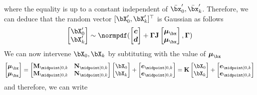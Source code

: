 where the equality is up to a constant independent of $\centeredxzero, \centeredxk$.
Therefore, we can deduce that the random vector $[\bX_0', \bX_k']^\top$ is Gaussian as follows
\begin{equation*}
    \begin{aligned}
       \begin{bmatrix}\bX_0'\\\bX_k'\end{bmatrix}
       \sim
       \normpdf(
            \begin{bmatrix}\biaszero\\\biask\end{bmatrix}
            + \mathbf{\Gamma} \mathbf{J} \begin{bmatrix}\meantau \\ \meantau\end{bmatrix}
            ,
            \mathbf{\Gamma}
       )
    \end{aligned}
\end{equation*}
We can now intervene $\bX_0, \bX_k$ by subtituting with the value of $\meantau$
\begin{align*}
    \begin{bmatrix}\meantau \\ \meantau\end{bmatrix}
        = \begin{bmatrix}
            \pizero_{\midpoint| 0, k} & \pik_{\midpoint| 0, k}\\ 
            \pizero_{\midpoint| 0, k} & \pik_{\midpoint| 0, k} 
        \end{bmatrix} 
        \begin{bmatrix}\bX_0 \\ \bX_k\end{bmatrix}
        +
        \begin{bmatrix}\pibias_{\midpoint| 0, k} \\ \pibias_{\midpoint| 0, k}\end{bmatrix}
        = \mathbf{K} \begin{bmatrix}\bX_0 \\ \bX_k\end{bmatrix} + \begin{bmatrix}\pibias_{\midpoint| 0, k} \\ \pibias_{\midpoint| 0, k}\end{bmatrix}
\end{align*}
and therefore, we can write
